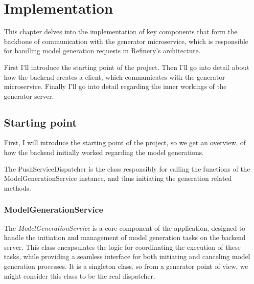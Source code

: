 \chapter{Implementation}

	This chapter delves into the implementation of key components that form the backbone of communication with the generator microservice, 
	which is responsible for handling model generation requests in Refinery's architecture.

	First I'll introduce the starting point of the project.
	Then I'll go into detail about how the backend creates a client, which communicates with the generator microservice. Finally I'll go into detail
	regarding the inner workings of the generator server.

	\section{Starting point}
		First, I will introduce the starting point of the project, so we get an overview, of how the backend initially worked regarding the model
		generations.

		The PushServiceDispatcher is the class responsibly for calling the functions of the ModelGenerationService instance, and thus initiating
		the generation related methods.

		\subsection{ModelGenerationService}
			The \textit{ModelGenerationService} is a core component of the application, designed to handle the initiation and management of
			model generation tasks on the backend server. This class encapsulates the logic for coordinating the execution of these 
			tasks, while providing a seamless interface for both initiating and canceling model generation processes.
			It is a singleton class, so from a generator point of view, we might consider this class to be the real dispatcher.

